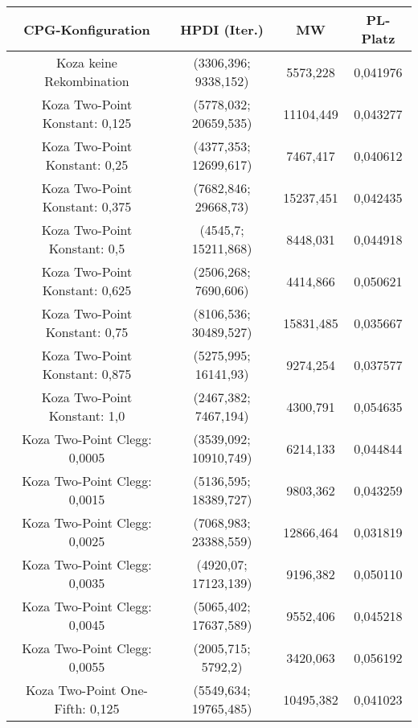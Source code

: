 \begin{table}[H]
	\centering
	\begin{tabular}{c | c | c | c}
		\textbf{CPG-Konfiguration} & \textbf{HPDI (Iter.)} & \textbf{MW} & \textbf{PL-Platz}\\
		\hline
		Koza keine Rekombination & (3306,396; 9338,152) & 5573,228 & 0,041976\\
		\hline
		\hline
		Koza Two-Point Konstant: 0,125 & (5778,032; 20659,535) & 11104,449 & 0,043277\\
		\hline
		Koza Two-Point Konstant: 0,25 & (4377,353; 12699,617) & 7467,417 & 0,040612\\
		\hline
		Koza Two-Point Konstant: 0,375 & (\color{red}7682,846\color{black}; \color{red}29668,73\color{black}) & \color{red}15237,451\color{black} & 0,042435\\
		\hline
		Koza Two-Point Konstant: 0,5 & (4545,7; 15211,868) & 8448,031 & 0,044918\\
		\hline
		Koza Two-Point Konstant: 0,625 & (2506,268; 7690,606) & 4414,866 & 0,050621\\
		\hline
		Koza Two-Point Konstant: 0,75 & (\color{red}8106,536\color{black}; \color{red}30489,527\color{black}) & \color{red}15831,485\color{black} & 0,035667\\
		\hline
		Koza Two-Point Konstant: 0,875 & (5275,995; 16141,93) & 9274,254 & 0,037577\\
		\hline
		Koza Two-Point Konstant: 1,0 & (\color{Green}2467,382\color{black}; 7467,194) & \color{Green}4300,791\color{black} & \color{Green}0,054635\color{black}\\
		\hline
		\hline
		Koza Two-Point Clegg: 0,0005 & (3539,092; 10910,749) & 6214,133 & 0,044844\\
		\hline
		Koza Two-Point Clegg: 0,0015 & (5136,595; 18389,727) & 9803,362 & 0,043259\\
		\hline
		Koza Two-Point Clegg: 0,0025 & (7068,983; 23388,559) & 12866,464 & \color{red}0,031819\color{black}\\
		\hline
		Koza Two-Point Clegg: 0,0035 & (4920,07; 17123,139) & 9196,382 & 0,050110\\
		\hline
		Koza Two-Point Clegg: 0,0045 & (5065,402; 17637,589) & 9552,406 & 0,045218\\
		\hline
		Koza Two-Point Clegg: 0,0055 & (\color{Green}2005,715\color{black}; \color{Green}5792,2\color{black}) & \color{Green}3420,063\color{black} & \color{Green}0,056192\color{black}\\
		\hline
		\hline
		Koza Two-Point One-Fifth: 0,125 & (5549,634; 19765,485) & 10495,382 & 0,041023\\

\end{tabular}
\end{table}
